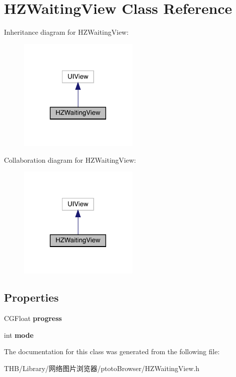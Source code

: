 \hypertarget{interface_h_z_waiting_view}{}\section{H\+Z\+Waiting\+View Class Reference}
\label{interface_h_z_waiting_view}


Inheritance diagram for H\+Z\+Waiting\+View\+:\nopagebreak
\begin{figure}[H]
\begin{center}
\leavevmode
\includegraphics[width=164pt]{interface_h_z_waiting_view__inherit__graph}
\end{center}
\end{figure}


Collaboration diagram for H\+Z\+Waiting\+View\+:\nopagebreak
\begin{figure}[H]
\begin{center}
\leavevmode
\includegraphics[width=164pt]{interface_h_z_waiting_view__coll__graph}
\end{center}
\end{figure}
\subsection*{Properties}
\begin{DoxyCompactItemize}
\item 
\mbox{\label{interface_h_z_waiting_view_a71816b54e68ec7e5f7ba118679ba430d}} 
C\+G\+Float {\bfseries progress}
\item 
\mbox{\label{interface_h_z_waiting_view_a594c6f6d4c788f8731fab7e34a4b2a07}} 
int {\bfseries mode}
\end{DoxyCompactItemize}


The documentation for this class was generated from the following file\+:\begin{DoxyCompactItemize}
\item 
T\+H\+B/\+Library/网络图片浏览器/ptoto\+Browser/H\+Z\+Waiting\+View.\+h\end{DoxyCompactItemize}
